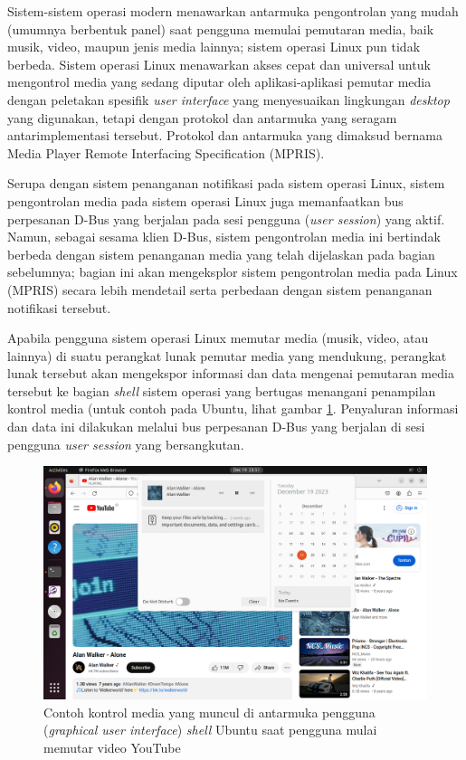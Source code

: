 Sistem-sistem operasi modern menawarkan antarmuka pengontrolan yang mudah (umumnya berbentuk panel) saat pengguna memulai pemutaran media, baik musik, video, maupun jenis media lainnya; sistem operasi Linux pun tidak berbeda. Sistem operasi Linux menawarkan akses cepat dan universal untuk mengontrol media yang sedang diputar oleh aplikasi-aplikasi pemutar media dengan peletakan spesifik \textit{user interface} yang menyesuaikan lingkungan \textit{desktop} yang digunakan, tetapi dengan protokol dan antarmuka yang seragam antarimplementasi tersebut. Protokol dan antarmuka yang dimaksud bernama Media Player Remote Interfacing Specification (MPRIS).

Serupa dengan sistem penanganan notifikasi pada sistem operasi Linux, sistem pengontrolan media pada sistem operasi Linux juga memanfaatkan bus perpesanan D-Bus yang berjalan pada sesi pengguna (\textit{user session}) yang aktif. Namun, sebagai sesama klien D-Bus, sistem pengontrolan media ini bertindak berbeda dengan sistem penanganan media yang telah dijelaskan pada bagian sebelumnya; bagian ini akan mengeksplor sistem pengontrolan media pada Linux (MPRIS) secara lebih mendetail serta perbedaan dengan sistem penanganan notifikasi tersebut.

Apabila pengguna sistem operasi Linux memutar media (musik, video, atau lainnya) di suatu perangkat lunak pemutar media yang mendukung, perangkat lunak tersebut akan mengekspor informasi dan data mengenai pemutaran media tersebut ke bagian \textit{shell} sistem operasi yang bertugas menangani penampilan kontrol media (untuk contoh pada Ubuntu, lihat gambar \ref{ubuntu-media-controls}. Penyaluran informasi dan data ini dilakukan melalui bus perpesanan D-Bus yang berjalan di sesi pengguna \textit{user session} yang bersangkutan.

\begin{figure}
    \centering
    \includegraphics[width=1\linewidth]{archives//contents-template-pak-prapto//chapter-4/Screenshot from 2023-12-19 23-51-47.png}
    \caption{Contoh kontrol media yang muncul di antarmuka pengguna (\textit{graphical user interface}) \textit{shell} Ubuntu saat pengguna mulai memutar video YouTube}
    \label{ubuntu-media-controls}
\end{figure}

